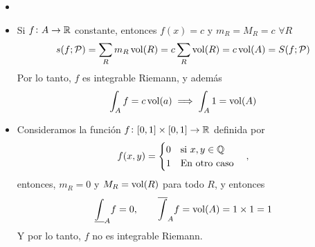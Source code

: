 \begin{example}
    \begin{itemize}
        \item[]
        \item Si $f \colon A \to \mathbb{R}$ constante, entonces  $f(x) = c$ y
            $m_R = M_R = c$ $\forall R$
            \[
                s(f;\mathcal{P}) = \sum_R m_R \operatorname{vol}(R) = c \sum_R \operatorname{vol}(R)
                = c\operatorname{vol}(A) = S(f;\mathcal{P})
            \]
            Por lo tanto, $f$ es integrable Riemann, y además
            \[
                \int_A f = c\operatorname{vol}(a) \implies \int_A 1 = \operatorname{vol}(A)
            \]
        \item Consideramos la función $f \colon [0,1] \times [0,1] \to \mathbb{R}$
            definida por
            \[
                f(x,y) =
                \begin{cases}
                    0 \quad \text{si } x,y \in \mathbb{Q} \\
                    1 \quad \text{En otro caso}
                \end{cases},
            \]
            entonces, $m_R = 0$ y $M_R = \operatorname{vol}(R)$ para todo
            $R$, y entonces
            \[
                \underline{\int}_A f = 0, \qquad
                \overline{\int}_A f = \operatorname{vol}(A) = 1\times1 = 1
            \]
            Y por lo tanto, $f$ no es integrable Riemann.
    \end{itemize}
\end{example}

